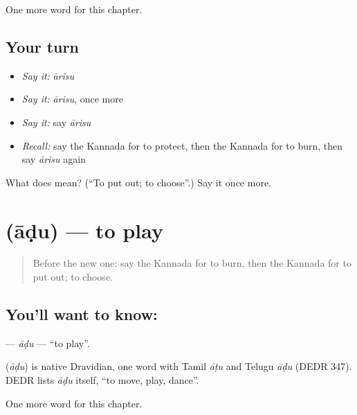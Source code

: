 \begin{grammarlens}[title={What you've built}]
One more word for this chapter.
\end{grammarlens}

\subsection*{Your turn}
\begin{itemize}
\raggedright
  \item \emph{Say it:} \emph{ārisu}
  \item \emph{Say it:} \emph{ārisu}, once more
  \item \emph{Say it:} say \emph{ārisu}
  \item \emph{Recall:} say the Kannada for to protect, then the Kannada for to burn, then say \emph{ārisu} again
\end{itemize}

\begin{tcolorbox}[breakable,colback=teal!4,colframe=teal!35!black,title={Before you move on}]
What does  mean? (\textquotedblleft{}To put out; to choose\textquotedblright{}.) Say it once more.
\end{tcolorbox}
\section[\texorpdfstring{\kn{ಆಡು} (āḍu)}{ಆಡು (āḍu)}]{ (āḍu) — to play}

\label{lesson:KA-C152-adu}



\begin{quote}
Before the new one: say the Kannada for to burn, then the Kannada for to put out; to choose.
\end{quote}

\subsection*{You'll want to know: }
\textbf{} — \emph{āḍu} — \textquotedblleft{}to play\textquotedblright{}.

\begin{cousinweb}
\textbf{} (\emph{āḍu}) is native Dravidian, one word with Tamil \emph{āṭu} and Telugu \emph{āḍu} (DEDR 347). DEDR lists \emph{āḍu} itself, \textquotedblleft{}to move, play, dance\textquotedblright{}.
\end{cousinweb}

\begin{grammarlens}[title={What you've built}]
One more word for this chapter.
\end{grammarlens}

